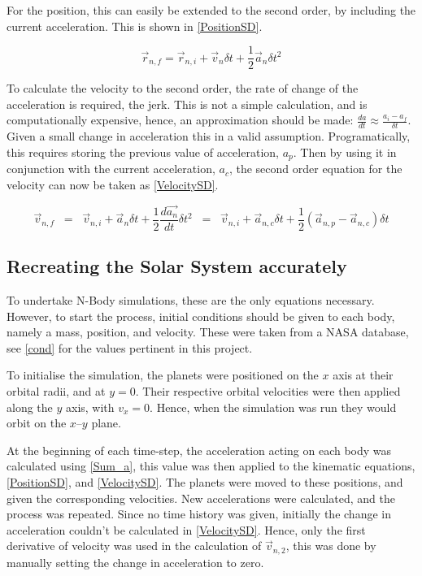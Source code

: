 \documentclass[a4paper,10pt]{article}
\begin{document}
For the position, this can easily be extended to the second order, by including the current acceleration. This is shown in \cref{PositionSD}.

\begin{equation} \label{PositionSD}
    \vec{r}_{n,f} =  \vec{r}_{n,i} + \vec{v}_{n} \delta t + \frac{1}{2}\vec{a}_{n}\delta t^2
\end{equation}

To calculate the velocity to the second order, the rate of change of the acceleration is required, the jerk. This is not a simple calculation, and is computationally expensive, hence, an approximation should be made: $\frac{da}{dt} \approx \frac{a_i - a_f}{\delta t}$. Given a small change in acceleration this in a valid assumption. Programatically, this requires storing the previous value of acceleration, $a_p$. Then by using it in conjunction with the current acceleration, $a_c$, the second order equation for the velocity can now be taken as \cref{VelocitySD}.

\begin{equation} \label{VelocitySD}
     \vec{v}_{n,f} \;\; =  \;\; \vec{v}_{n,i} + \vec{a}_{n} \delta t + \frac{1}{2}\frac{d\vec{a_n}}{dt}\delta t^2 \;\; = \;\; \vec{v}_{n,i} + \vec{a}_{n,c} \delta t + \frac{1}{2}(\vec{a}_{n,p} - \vec{a}_{n,c})\delta t
\end{equation}

\subsection{Recreating the Solar System accurately}

To undertake N-Body simulations, these are the only equations necessary. However, to start the process, initial conditions should be given to each body, namely a mass, position, and velocity. These were taken from a NASA database\cite{PlanetFacts}, see \cref{cond} for the values pertinent in this project.  

To initialise the simulation, the planets were positioned on the $x$ axis at their orbital radii, and at $y=0$. Their respective orbital velocities were then applied along the $y$ axis, with $v_x = 0$. Hence, when the simulation was run they would orbit on the $x$--$y$ plane. 

At the beginning of each time-step, the acceleration acting on each body was calculated using \cref{Sum_a}, this value was then applied to the kinematic equations, \cref{PositionSD}, and \cref{VelocitySD}. The planets were moved to these positions, and given the corresponding velocities. New accelerations were calculated, and the process was repeated. Since no time history was given, initially the change in acceleration couldn't be calculated in \cref{VelocitySD}. Hence, only the first derivative of velocity was used in the calculation of $\vec v_{n,2}$, this was done by manually setting the change in acceleration to zero.
\end{document}
